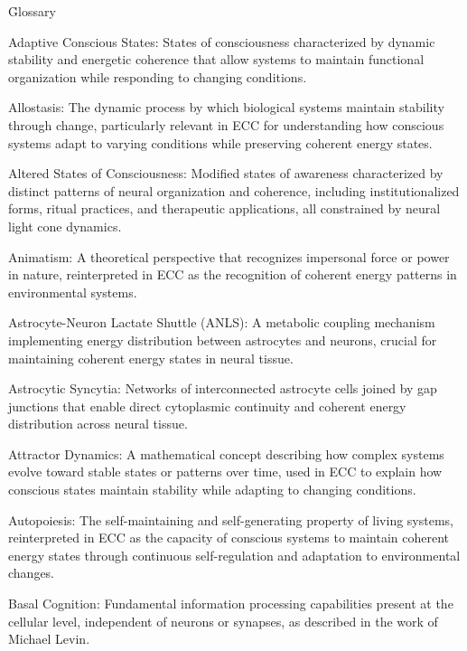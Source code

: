 \h{Glossary}

Adaptive Conscious States: States of consciousness characterized by dynamic stability and energetic coherence that allow systems to maintain functional organization while responding to changing conditions.

Allostasis: The dynamic process by which biological systems maintain stability through change, particularly relevant in ECC for understanding how conscious systems adapt to varying conditions while preserving coherent energy states.

Altered States of Consciousness: Modified states of awareness characterized by distinct patterns of neural organization and coherence, including institutionalized forms, ritual practices, and therapeutic applications, all constrained by neural light cone dynamics.

Animatism: A theoretical perspective that recognizes impersonal force or power in nature, reinterpreted in ECC as the recognition of coherent energy patterns in environmental systems.

Astrocyte-Neuron Lactate Shuttle (ANLS): A metabolic coupling mechanism implementing energy distribution between astrocytes and neurons, crucial for maintaining coherent energy states in neural tissue.

Astrocytic Syncytia: Networks of interconnected astrocyte cells joined by gap junctions that enable direct cytoplasmic continuity and coherent energy distribution across neural tissue.

Attractor Dynamics: A mathematical concept describing how complex systems evolve toward stable states or patterns over time, used in ECC to explain how conscious states maintain stability while adapting to changing conditions.

Autopoiesis: The self-maintaining and self-generating property of living systems, reinterpreted in ECC as the capacity of conscious systems to maintain coherent energy states through continuous self-regulation and adaptation to environmental changes.

Basal Cognition: Fundamental information processing capabilities present at the cellular level, independent of neurons or synapses, as described in the work of Michael Levin.

